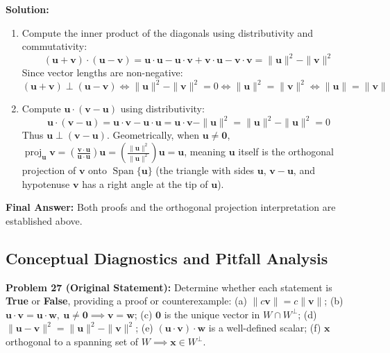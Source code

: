 \documentclass[11pt, letterpaper]{article}
\theoremstyle{definition}
\theoremstyle{remark}
\begin{document}
\textbf{Solution:}
\begin{enumerate}[label=(\alph*)]
    \item Compute the inner product of the diagonals using distributivity and commutativity:
    \[
    (\mathbf{u} + \mathbf{v}) \cdot (\mathbf{u} - \mathbf{v}) = \mathbf{u} \cdot \mathbf{u} - \mathbf{u} \cdot \mathbf{v} + \mathbf{v} \cdot \mathbf{u} - \mathbf{v} \cdot \mathbf{v} = \|\mathbf{u}\|^2 - \|\mathbf{v}\|^2
    \]
    Since vector lengths are non-negative:
    \[
    (\mathbf{u} + \mathbf{v}) \perp (\mathbf{u} - \mathbf{v}) \iff \|\mathbf{u}\|^2 - \|\mathbf{v}\|^2 = 0 \iff \|\mathbf{u}\|^2 = \|\mathbf{v}\|^2 \iff \|\mathbf{u}\| = \|\mathbf{v}\|
    \]
    \item Compute $\mathbf{u} \cdot (\mathbf{v} - \mathbf{u})$ using distributivity:
    \[
    \mathbf{u} \cdot (\mathbf{v} - \mathbf{u}) = \mathbf{u} \cdot \mathbf{v} - \mathbf{u} \cdot \mathbf{u} = \mathbf{u} \cdot \mathbf{v} - \|\mathbf{u}\|^2 = \|\mathbf{u}\|^2 - \|\mathbf{u}\|^2 = 0
    \]
    Thus $\mathbf{u} \perp (\mathbf{v} - \mathbf{u})$. Geometrically, when $\mathbf{u} \neq \mathbf{0}$, $\operatorname{proj}_{\mathbf{u}}\mathbf{v} = \left(\frac{\mathbf{v} \cdot \mathbf{u}}{\mathbf{u} \cdot \mathbf{u}}\right)\mathbf{u} = \left(\frac{\|\mathbf{u}\|^2}{\|\mathbf{u}\|^2}\right)\mathbf{u} = \mathbf{u}$, meaning $\mathbf{u}$ itself is the orthogonal projection of $\mathbf{v}$ onto $\operatorname{Span}\{\mathbf{u}\}$ (the triangle with sides $\mathbf{u}$, $\mathbf{v} - \mathbf{u}$, and hypotenuse $\mathbf{v}$ has a right angle at the tip of $\mathbf{u}$).
\end{enumerate}
\textbf{Final Answer:} Both proofs and the orthogonal projection interpretation are established above.

\subsection{Conceptual Diagnostics and Pitfall Analysis}

\textbf{Problem 27 (Original Statement):} Determine whether each statement is \textbf{True} or \textbf{False}, providing a proof or counterexample: (a) $\|c\mathbf{v}\| = c\|\mathbf{v}\|$; (b) $\mathbf{u} \cdot \mathbf{v} = \mathbf{u} \cdot \mathbf{w},\ \mathbf{u} \neq \mathbf{0} \implies \mathbf{v} = \mathbf{w}$; (c) $\mathbf{0}$ is the unique vector in $W \cap W^{\perp}$; (d) $\|\mathbf{u} - \mathbf{v}\|^2 = \|\mathbf{u}\|^2 - \|\mathbf{v}\|^2$; (e) $(\mathbf{u} \cdot \mathbf{v}) \cdot \mathbf{w}$ is a well-defined scalar; (f) $\mathbf{x}$ orthogonal to a spanning set of $W \implies \mathbf{x} \in W^{\perp}$.
\end{document}

